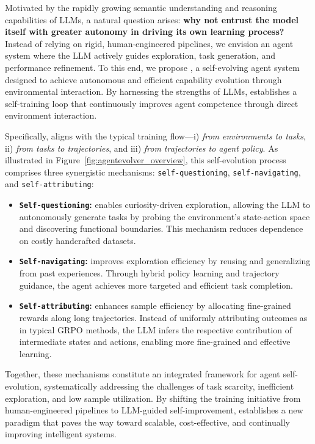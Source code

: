 Motivated by the rapidly growing semantic understanding and reasoning capabilities of LLMs, a natural question arises: \textbf{why not entrust the model itself with greater autonomy in driving its own learning process?} Instead of relying on rigid, human-engineered pipelines, we envision an agent system where the LLM actively guides exploration, task generation, and performance refinement. To this end, we propose \textbf{\AgentEvolver}, a self-evolving agent system designed to achieve autonomous and efficient capability evolution through environmental interaction. By harnessing the strengths of LLMs, \AgentEvolver establishes a self-training loop that continuously improves agent competence through direct environment interaction.


Specifically, \AgentEvolver aligns with the typical training flow—i) \emph{from environments to tasks}, ii) \emph{from tasks to trajectories}, and iii) \emph{from trajectories to agent policy}. 
As illustrated in Figure~\ref {fig:agentevolver_overview}, this self-evolution process comprises three synergistic mechanisms: \texttt{self-questioning}, \texttt{self-navigating}, and \texttt{self-attributing}:
\begin{itemize}
    \item \textbf{\texttt{Self-questioning}:} enables curiosity-driven exploration, allowing the LLM to autonomously generate tasks by probing the environment's state-action space and discovering functional boundaries. This mechanism reduces dependence on costly handcrafted datasets.
    \item \textbf{\texttt{Self-navigating}:} improves exploration efficiency by reusing and generalizing from past experiences. Through hybrid policy learning and trajectory guidance, the agent achieves more targeted and efficient task completion.
    \item \textbf{\texttt{Self-attributing}:} enhances sample efficiency by allocating fine-grained rewards along long trajectories. Instead of uniformly attributing outcomes as in typical GRPO methods, the LLM infers the respective contribution of intermediate states and actions, enabling more fine-grained and effective learning.
\end{itemize}
Together, these mechanisms constitute an integrated framework for agent self-evolution, systematically addressing the challenges of task scarcity, inefficient exploration, and low sample utilization. By shifting the training initiative from human-engineered pipelines to LLM-guided self-improvement, \AgentEvolver establishes a new paradigm that paves the way toward scalable, cost-effective, and continually improving intelligent systems.


